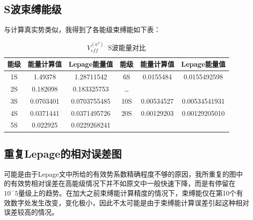 \documentclass{ctexart}
\begin{document}
\subsection{S波束缚能级}
与计算真实势类似，我得到了各能级束缚能如下表：
\begin{table}[!htbp]
  \centering
  \begin{tabular}{|cccccc|}
    \hline
    能级 & 能量计算值 & Lepage能量值 & 能级 & 能量计算值 & Lepage能量值 \\
    \hline
    1S & 1.49378 & 1.28711542 & 6S & 0.0155484 & 0.0155492598 \\
    2S & 0.182098 & 0.183325753  & \dots &   & \\
    3S & 0.0703401 & 0.0703755485 & 10S & 0.00534527 & 0.00534541931 \\
    4S & 0.0371441 & 0.0371495726 & 20S & 0.00129203 & 0.00129205010 \\
    5S & 0.022925 & 0.0229268241  &  &  &  \\
    \hline
  \end{tabular}
  \caption{$V_{eff}^{(a^4)}\;\;$S波能量对比}
\end{table}
\subsection{重复Lepage的相对误差图}
可能是由于Lepage文中所给的有效势系数精确程度不够的原因，我所重复的图中的有效势相对误差在高能级情况下并不如原文中一般快速下降，而是有停留在$10^-5$量级上的趋势。在加大之前束缚能计算精度的情况下，束缚能仅在第10个有效数字处发生改变，变化极小，因此不太可能是由于束缚能计算误差引起这种相对误差较高的情况。
\end{document}

